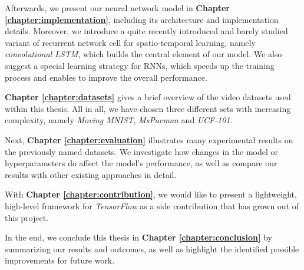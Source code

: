 Afterwards, we present our neural network model in \textbf{Chapter \ref{chapter:implementation}}, including its architecture and implementation details. Moreover, we introduce a quite recently introduced and barely studied variant of recurrent network cell for spatio-temporal learning, namely \textit{convolutional LSTM}, which builds the central element of our model. We also suggest a special learning strategy for RNNs, which speeds up the training process and enables to improve the overall performance.

\textbf{Chapter \ref{chapter:datasets}} gives a brief overview of the video datasets used within this thesis. All in all, we have chosen three different sets with increasing complexity, namely \textit{Moving MNIST}, \textit{MsPacman} and \textit{UCF-101}.

Next, \textbf{Chapter \ref{chapter:evaluation}} illustrates many experimental results on the previously named datasets. We investigate how changes in the model or hyperparameters do affect the model's performance, as well as compare our results with other existing approaches in detail.

With \textbf{Chapter \ref{chapter:contribution}}, we would like to present a lightweight, high-level framework for \textit{TensorFlow} as a side contribution that has grown out of this project.

In the end, we conclude this thesis in \textbf{Chapter \ref{chapter:conclusion}} by summarizing our results and outcomes, as well as highlight the identified possible improvements for future work.



